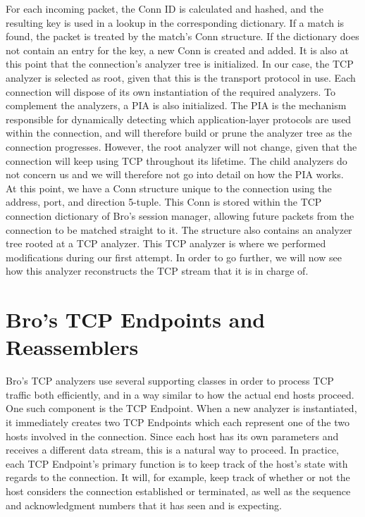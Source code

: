 For each incoming packet, the Conn ID is calculated and hashed, and the resulting key is used in a lookup in the corresponding dictionary. If a match is found, the packet is treated by the match's Conn structure. If the dictionary does not contain an entry for the key, a new Conn is created and added. It is also at this point that the connection's analyzer tree is initialized. In our case, the TCP analyzer is selected as root, given that this is the transport protocol in use. Each connection will dispose of its own instantiation of the required analyzers. To complement the analyzers, a PIA is also initialized. The PIA is the mechanism responsible for dynamically detecting which application-layer protocols are used within the connection, and will therefore build or prune the analyzer tree as the connection progresses. However, the root analyzer will not change, given that the connection will keep using TCP throughout its lifetime. The child analyzers do not concern us and we will therefore not go into detail on how the PIA works.\\

At this point, we have a Conn structure unique to the connection using the address, port, and direction 5-tuple. This Conn is stored within the TCP connection dictionary of Bro's session manager, allowing future packets from the connection to be matched straight to it. The structure also contains an analyzer tree rooted at a TCP analyzer. This TCP analyzer is where we performed modifications during our first attempt. In order to go further, we will now see how this analyzer reconstructs the TCP stream that it is in charge of.

\section{Bro's TCP Endpoints and Reassemblers}

Bro's TCP analyzers use several supporting classes in order to process TCP traffic both efficiently, and in a way similar to how the actual end hosts proceed. One such component is the TCP Endpoint. When a new analyzer is instantiated, it immediately creates two TCP Endpoints which each represent one of the two hosts involved in the connection. Since each host has its own parameters and receives a different data stream, this is a natural way to proceed. In practice, each TCP Endpoint's primary function is to keep track of the host's state with regards to the connection. It will, for example, keep track of whether or not the host considers the connection established or terminated, as well as the sequence and acknowledgment numbers that it has seen and is expecting. \\

